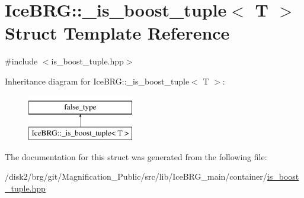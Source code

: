\hypertarget{structIceBRG_1_1__is__boost__tuple}{}\section{Ice\+B\+R\+G\+:\+:\+\_\+is\+\_\+boost\+\_\+tuple$<$ T $>$ Struct Template Reference}
\label{structIceBRG_1_1__is__boost__tuple}


{\ttfamily \#include $<$is\+\_\+boost\+\_\+tuple.\+hpp$>$}

Inheritance diagram for Ice\+B\+R\+G\+:\+:\+\_\+is\+\_\+boost\+\_\+tuple$<$ T $>$\+:\begin{figure}[H]
\begin{center}
\leavevmode
\includegraphics[height=2.000000cm]{structIceBRG_1_1__is__boost__tuple}
\end{center}
\end{figure}


The documentation for this struct was generated from the following file\+:\begin{DoxyCompactItemize}
\item 
/disk2/brg/git/\+Magnification\+\_\+\+Public/src/lib/\+Ice\+B\+R\+G\+\_\+main/container/\hyperlink{is__boost__tuple_8hpp}{is\+\_\+boost\+\_\+tuple.\+hpp}\end{DoxyCompactItemize}
